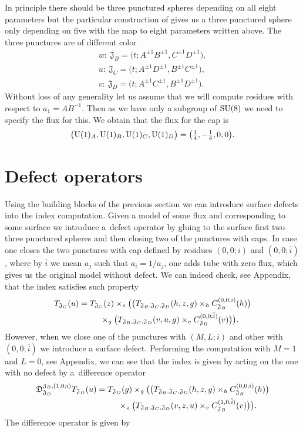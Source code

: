 \documentclass[a4paper,12pt]{article}
\begin{document}
In principle there should be three punctured spheres depending on all eight parameters but the particular construction of gives us a three punctured sphere only depending on five with the map to eight parameters written above.
The three punctures are of different color
\begin{gather*}
w\colon \ {\mathfrak J}_B=\big(t; A^{\pm1}B^{\pm1},C^{\pm1}D^{\pm1}\big) , \\
u\colon \ {\mathfrak J}_C=\big(t;A^{\pm1}D^{\pm1},B^{\pm1}C^{\pm1}\big) , \\
v\colon \ {\mathfrak J}_D=\big(t; A^{\pm1}C^{\pm1}, B^{\pm1}D^{\pm1}\big) .
\end{gather*}
Without loss of any generality let us assume that we will compute residues with respect to $a_1=A B^{-1}$. Then as we have only a subgroup of ${\rm SU}(8)$ we need to specify the flux for this. We obtain that the flux for the cap is
\begin{gather*} \big({\rm U}(1)_A,{\rm U}(1)_B,{\rm U}(1)_C,{\rm U}(1)_D\big) = \big(\tfrac14,-\tfrac14,0,0\big) .
\end{gather*}
\section{Defect operators}
Using the building blocks of the previous section we can introduce surface defects into the index computation. Given a model of some flux and corresponding to some surface we introduce a~defect operator by gluing to the surface first two three punctured spheres and then closing two of the punctures with caps. In case one closes the two punctures with cap defined by residues $(0,0;i)$ and $(0,0;\overline i)$, where by $\overline i$ we mean $a_j$ such that $a_i=1/a_j$, one adds tube with zero flux, which gives us the original model without defect. We can indeed check, see Appendix, that the index satisfies such property
\begin{gather}
T_{{\mathfrak J}_C}(u)= T_{{\mathfrak J}_C}(z)\times_z \big(\big(T_{{\mathfrak J}_B, {\mathfrak J}_C,{\mathfrak J}_D}(h,z,g)\times_h C^{(0,0;i)}_{{\mathfrak J}_B}(h)\big)\nonumber\\
\hphantom{T_{{\mathfrak J}_C}(u)=}{}
\times_g\big(T_{{\mathfrak J}_B, {\mathfrak J}_C,{\mathfrak J}_D}(v,u,g)\times_v C^{(0,0;\overline i)}_{{\mathfrak J}_B}(v)\big)\big) .
\end{gather}
However, when we close one of the punctures with $(M,L;i)$ and other with $(0,0;\overline i)$ we introduce a surface defect. Performing the computation with $M=1$ and $L=0$, see Appendix, we can see that the index is given by acting on the one with no defect by a~difference operator
\begin{gather*}
{\mathfrak D}_{{\mathfrak J}_D}^{{\mathfrak J}_B,(1,0;i)}T_{{\mathfrak J}_D}(u)=
T_{{\mathfrak J}_D}(g)\times_g \big(\big(T_{{\mathfrak J}_B, {\mathfrak J}_C,{\mathfrak J}_D}(h,z,g)\times_h C^{(0,0;i)}_{{\mathfrak J}_B}(h)\big)\\
\hphantom{{\mathfrak D}_{{\mathfrak J}_D}^{{\mathfrak J}_B,(1,0;i)}T_{{\mathfrak J}_D}(u)=}{}
\times_z\big(T_{{\mathfrak J}_B, {\mathfrak J}_C,{\mathfrak J}_D}(v,z,u)\times_v C^{(1,0;\overline i)}_{{\mathfrak J}_B}(v)\big)\big) .\nonumber
\end{gather*}
The difference operator is given by
\end{document}
